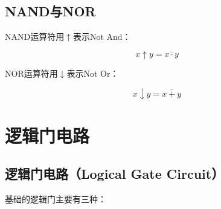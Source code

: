 \vspace{0.5cm}

\subsection{NAND与NOR}

NAND运算符用$ \uparrow $表示Not And：

\vspace{-0.5cm}

$$
	x \uparrow y = \overline{x \cdot y}
$$

NOR运算符用$ \downarrow $表示Not Or：

\vspace{-0.5cm}

$$
	x \downarrow y = \overline{x + y}
$$

\newpage

\section{逻辑门电路}

\subsection{逻辑门电路（Logical Gate Circuit）}

基础的逻辑门主要有三种：

